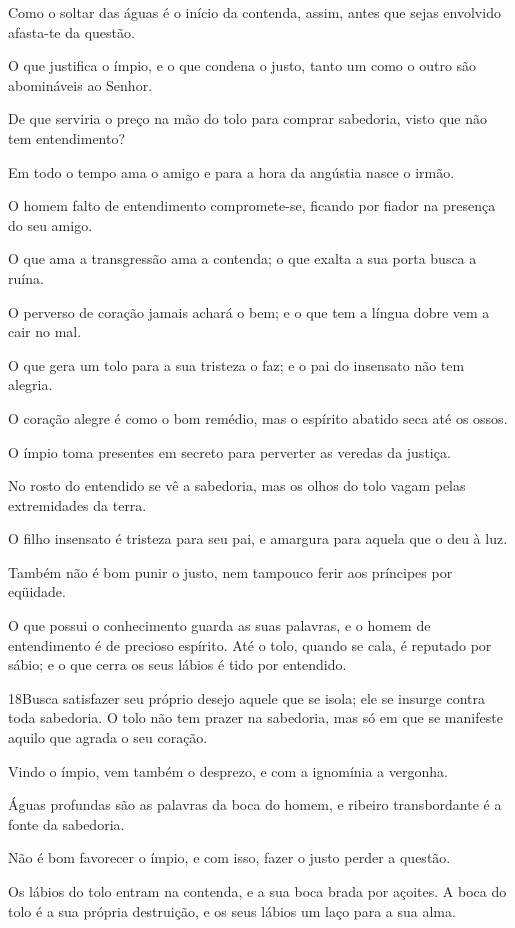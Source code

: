 Como o soltar das águas é o início da contenda, assim, antes que
sejas envolvido afasta-te da questão.

O que justifica o ímpio, e o que condena o justo, tanto um como o
outro são abomináveis ao Senhor.

De que serviria o preço na mão do tolo para comprar sabedoria,
visto que não tem entendimento?

Em todo o tempo ama o amigo e para a hora da angústia nasce o
irmão.

O homem falto de entendimento compromete-se, ficando por fiador
na presença do seu amigo.

O que ama a transgressão ama a contenda; o que exalta a sua porta
busca a ruína.

O perverso de coração jamais achará o bem; e o que tem a língua
dobre vem a cair no mal.

O que gera um tolo para a sua tristeza o faz; e o pai do
insensato não tem alegria.

O coração alegre é como o bom remédio, mas o espírito abatido
seca até os ossos.

O ímpio toma presentes em secreto para perverter as veredas da
justiça.

No rosto do entendido se vê a sabedoria, mas os olhos do tolo
vagam pelas extremidades da terra.

O filho insensato é tristeza para seu pai, e amargura para aquela
que o deu à luz.

Também não é bom punir o justo, nem tampouco ferir aos príncipes
por eqüidade.

O que possui o conhecimento guarda as suas palavras, e o homem de
entendimento é de precioso espírito. Até o tolo, quando se
cala, é reputado por sábio; e o que cerra os seus lábios é tido por
entendido.

\medskip

\lettrine{18}{}Busca satisfazer seu próprio desejo aquele que
se isola; ele se insurge contra toda sabedoria.  O
tolo não tem prazer na sabedoria, mas só em que se manifeste aquilo
que agrada o seu coração.

Vindo o ímpio, vem também o desprezo, e com a ignomínia a
vergonha.

Águas profundas são as palavras da boca do homem, e ribeiro
transbordante é a fonte da sabedoria.

Não é bom favorecer o ímpio, e com isso, fazer o justo perder a
questão.

Os lábios do tolo entram na contenda, e a sua boca brada por
açoites. A boca do tolo é a sua própria destruição, e os seus
lábios um laço para a sua alma.

